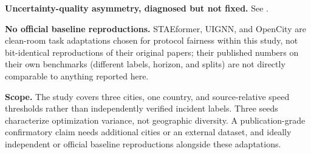 \textbf{Uncertainty-quality asymmetry, diagnosed but not fixed.} See .

\textbf{No official baseline reproductions.} STAEformer, UIGNN, and OpenCity are clean-room task
adaptations chosen for protocol fairness within this study, not bit-identical reproductions of
their original papers; their published numbers on their own benchmarks (different labels, horizon,
and splits) are not directly comparable to anything reported here.

\textbf{Scope.} The study covers three cities, one country, and source-relative speed thresholds
rather than independently verified incident labels. Three seeds characterize optimization
variance, not geographic diversity. A publication-grade confirmatory claim needs additional cities
or an external dataset, and ideally independent or official baseline reproductions alongside these
adaptations.
